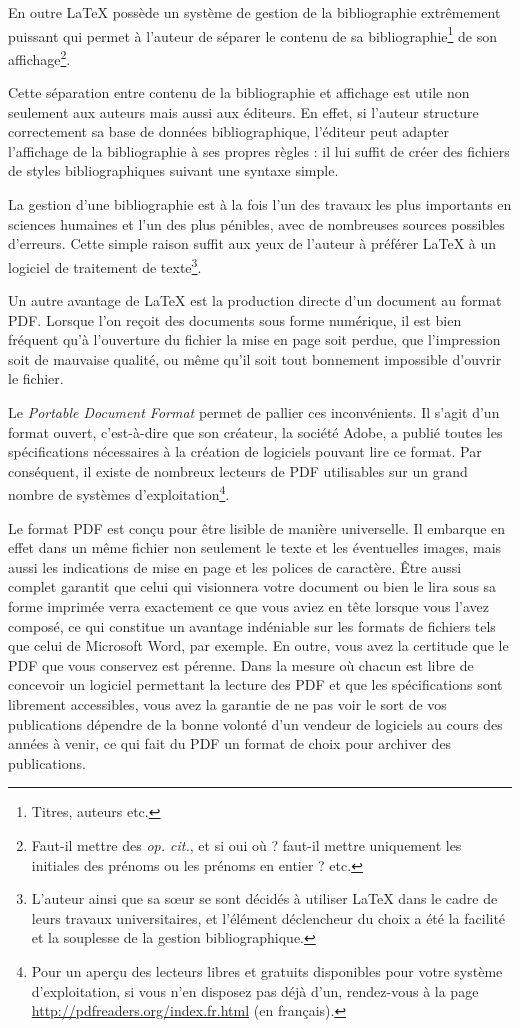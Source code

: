 En outre \LaTeX{} possède un système de gestion de la bibliographie extrêmement puissant qui permet à l'auteur de séparer le contenu de sa bibliographie\footnote{Titres, auteurs etc.} de son affichage\footnote{Faut-il mettre des \emph{op. cit.}, et si oui où ? faut-il mettre uniquement les initiales des prénoms ou les prénoms en entier ? etc.}.

Cette séparation entre contenu de la bibliographie et affichage est utile non seulement aux auteurs mais aussi aux éditeurs. En effet, si l'auteur structure correctement sa base de données bibliographique, l'éditeur peut adapter l'affichage de la bibliographie à ses propres règles : il lui suffit de créer des fichiers de styles bibliographiques suivant une syntaxe simple.

La gestion d'une bibliographie est à la fois l'un des travaux les plus importants en sciences humaines et l'un des plus pénibles, avec de nombreuses sources possibles d'erreurs. Cette simple raison suffit aux yeux de l'auteur à préférer \LaTeX{} à un logiciel de traitement de texte\footnote{L'auteur ainsi que sa sœur se sont décidés à utiliser \LaTeX{} dans le cadre de leurs travaux universitaires, et l'élément déclencheur du choix a été la facilité et la souplesse de la gestion bibliographique.}.

Un autre avantage de \LaTeX{} est la production directe d'un document au format PDF. Lorsque l'on reçoit des documents sous forme numérique, il est bien fréquent qu'à l'ouverture du fichier la mise en page soit perdue, que l'impression soit de mauvaise qualité, ou même qu'il soit tout bonnement impossible d'ouvrir le fichier.

Le \emph{\textenglish{Portable Document Format}} permet de pallier ces inconvénients. Il s'agit d'un format ouvert, c'est-à-dire que son créateur, la société Adobe, a publié toutes les spécifications nécessaires à la création de logiciels pouvant lire ce format. Par conséquent, il existe de nombreux lecteurs de PDF utilisables sur un grand nombre de systèmes d'exploitation\footnote{Pour un aperçu des lecteurs libres et gratuits disponibles pour votre système d'exploitation, si vous n'en disposez pas déjà d'un, rendez-vous à la page \url{http://pdfreaders.org/index.fr.html} (en français).}.

Le format PDF est conçu pour être lisible de manière universelle. Il embarque en effet dans un même fichier non seulement le texte et les éventuelles images, mais aussi les indications de mise en page et les polices de caractère. Être aussi complet  garantit que celui qui visionnera votre document ou bien le lira sous sa forme imprimée verra exactement ce que vous aviez en tête lorsque vous l'avez composé, ce qui constitue un avantage indéniable sur les formats de fichiers tels que celui de Microsoft Word, par exemple. En outre, vous avez la certitude que le PDF que vous conservez est pérenne. Dans la mesure où chacun est libre de concevoir un logiciel permettant la lecture des PDF et que les spécifications sont librement accessibles, vous avez la garantie de ne pas voir le sort de vos publications dépendre de la bonne volonté d'un vendeur de logiciels au cours des années à venir, ce qui fait du PDF un format de choix pour archiver des publications.

